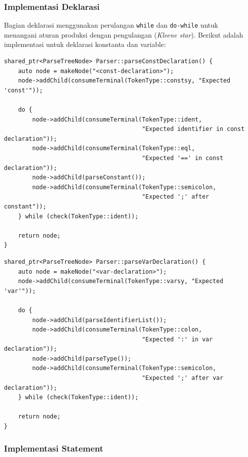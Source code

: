 \documentclass[12pt,a4paper]{article}
\begin{document}
\subsubsection{Implementasi Deklarasi}

Bagian deklarasi menggunakan perulangan \texttt{while} dan \texttt{do-while} untuk menangani aturan produksi dengan pengulangan (\textit{Kleene star}). Berikut adalah implementasi untuk deklarasi konstanta dan variable:

\begin{lstlisting}[style=cpp, caption={Implementasi deklarasi konstanta}]
shared_ptr<ParseTreeNode> Parser::parseConstDeclaration() {
    auto node = makeNode("<const-declaration>");
    node->addChild(consumeTerminal(TokenType::constsy, "Expected 'const'"));

    do {
        node->addChild(consumeTerminal(TokenType::ident,
                                       "Expected identifier in const declaration"));
        node->addChild(consumeTerminal(TokenType::eql,
                                       "Expected '==' in const declaration"));
        node->addChild(parseConstant());
        node->addChild(consumeTerminal(TokenType::semicolon,
                                       "Expected ';' after constant"));
    } while (check(TokenType::ident));

    return node;
}
\end{lstlisting}

\begin{lstlisting}[style=cpp, caption={Implementasi deklarasi variable}]
shared_ptr<ParseTreeNode> Parser::parseVarDeclaration() {
    auto node = makeNode("<var-declaration>");
    node->addChild(consumeTerminal(TokenType::varsy, "Expected 'var'"));

    do {
        node->addChild(parseIdentifierList());
        node->addChild(consumeTerminal(TokenType::colon,
                                       "Expected ':' in var declaration"));
        node->addChild(parseType());
        node->addChild(consumeTerminal(TokenType::semicolon,
                                       "Expected ';' after var declaration"));
    } while (check(TokenType::ident));

    return node;
}
\end{lstlisting}

\subsubsection{Implementasi Statement}
\end{document}
